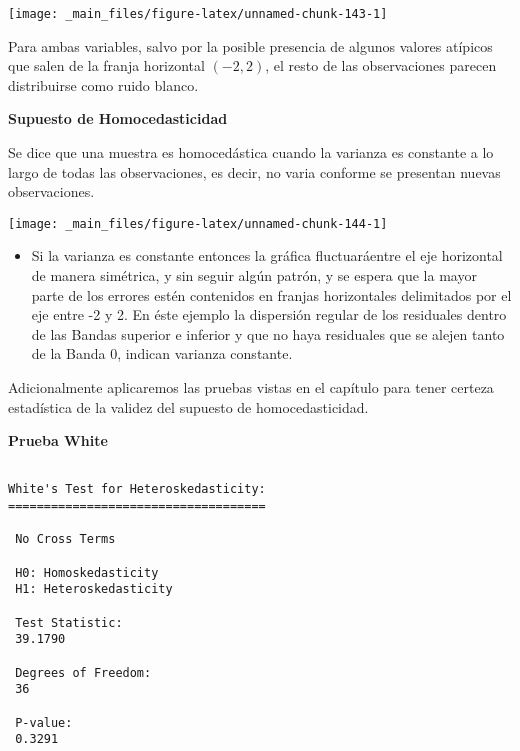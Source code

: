 \documentclass[
  a4paper,
  oneside,
  openany]{book}
\newenvironment{Shaded}{\begin{snugshade}}{\end{snugshade}}
\newcommand{\AttributeTok}[1]{\textcolor[rgb]{0.13,0.29,0.53}{#1}}
\newcommand{\DecValTok}[1]{\textcolor[rgb]{0.00,0.00,0.81}{#1}}
\newcommand{\FunctionTok}[1]{\textcolor[rgb]{0.13,0.29,0.53}{\textbf{#1}}}
\newcommand{\NormalTok}[1]{#1}
\newcommand{\OtherTok}[1]{\textcolor[rgb]{0.56,0.35,0.01}{#1}}
\newcommand{\SpecialCharTok}[1]{\textcolor[rgb]{0.81,0.36,0.00}{\textbf{#1}}}
\providecommand{\tightlist}{%
  \setlength{\itemsep}{0pt}\setlength{\parskip}{0pt}}
\begin{document}
\begin{center}\texttt{[image: \_main\_files/figure-latex/unnamed-chunk-143-1]} \end{center}

Para ambas variables, salvo por la posible presencia de algunos valores atípicos que salen de la franja horizontal \((-2,2)\), el resto de las observaciones parecen distribuirse como ruido blanco.

\textbf{Supuesto de Homocedasticidad}

Se dice que una muestra es homocedástica cuando la varianza es constante a lo largo de todas las observaciones, es decir, no varia conforme se presentan nuevas observaciones.

\begin{center}\texttt{[image: \_main\_files/figure-latex/unnamed-chunk-144-1]} \end{center}

\begin{itemize}
\tightlist
\item
  Si la varianza es constante entonces la gráfica fluctuaráentre el eje horizontal de manera simétrica, y sin seguir algún patrón, y se espera que la mayor parte de los errores estén contenidos en franjas horizontales delimitados por el eje entre -2 y 2. En éste ejemplo la dispersión regular de los residuales dentro de las Bandas superior e inferior y que no haya residuales que se alejen tanto de la Banda 0, indican varianza constante.
\end{itemize}

Adicionalmente aplicaremos las pruebas vistas en el capítulo para tener certeza estadística de la validez del supuesto de homocedasticidad.

\textbf{Prueba White}

\begin{Shaded}
\end{Shaded}

\begin{verbatim}

White's Test for Heteroskedasticity:
==================================== 

 No Cross Terms

 H0: Homoskedasticity
 H1: Heteroskedasticity

 Test Statistic:
 39.1790 

 Degrees of Freedom:
 36 

 P-value:
 0.3291 
\end{verbatim}
\end{document}
